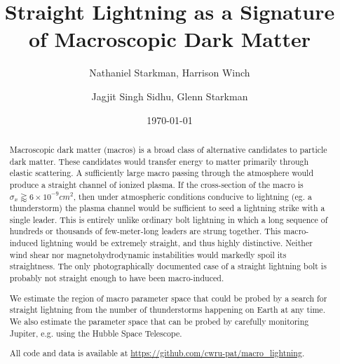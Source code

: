 \documentclass[%
 reprint,
 amsmath,amssymb,
 aps,
]{revtex4-2}
\begin{document}

\title{Straight Lightning as a Signature of Macroscopic Dark Matter}

\author{Nathaniel Starkman, Harrison Winch}%
%

\author{Jagjit Singh Sidhu, Glenn Starkman}

\date{\today}


\begin{abstract}

    Macroscopic dark matter (macros) is a broad class of alternative candidates to particle dark matter. These candidates would transfer energy to matter primarily through  elastic scattering. A sufficiently large macro passing through the atmosphere would produce a straight channel of ionized plasma. If the cross-section of the macro is $\sigma_x\gtrapprox6\times10^{-9}cm^2$, then under atmospheric conditions conducive to lightning (eg. a thunderstorm) the plasma channel would be sufficient to seed a lightning strike with a single leader. This is entirely unlike ordinary bolt lightning in which a long sequence of hundreds or thousands of few-meter-long leaders are strung together. This macro-induced lightning would be extremely straight, and thus highly distinctive. Neither wind shear nor magnetohydrodynamic instabilities would markedly spoil its straightness. The only photographically documented case of a straight lightning bolt is probably not straight enough to have been macro-induced.

    We estimate the region of macro parameter space that could be probed by a search for straight lightning from the number of thunderstorms happening on Earth at any time. We also estimate the parameter space that can be probed by carefully monitoring Jupiter, e.g. using the Hubble Space Telescope.

    All code and data is available at \url{https://github.com/cwru-pat/macro_lightning}.

\end{abstract}
\end{document}

